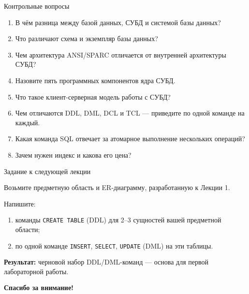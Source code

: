 \documentclass[aspectratio=169]{beamer}
\begin{document}
\begin{frame}{Контрольные вопросы}

\small
\begin{enumerate}
  \item В чём разница между базой данных, СУБД и системой базы данных?
  \item Что различают схема и экземпляр базы данных?
  \item Чем архитектура ANSI/SPARC отличается от внутренней архитектуры СУБД?
  \item Назовите пять программных компонентов ядра СУБД.
  \item Что такое клиент-серверная модель работы с СУБД?
  \item Чем отличаются DDL, DML, DCL и TCL — приведите по одной команде на каждый.
  \item Какая команда SQL отвечает за атомарное выполнение нескольких операций?
  \item Зачем нужен индекс и какова его цена?
\end{enumerate}

\end{frame}


\begin{frame}[fragile]{Задание к следующей лекции}

Возьмите предметную область и ER-диаграмму,
разработанную к Лекции 1.

\vspace{0.3cm}

Напишите:
\begin{enumerate}
  \item команды \texttt{CREATE TABLE} (DDL) для 2--3 сущностей
        вашей предметной области;
  \item по одной команде \texttt{INSERT}, \texttt{SELECT},
        \texttt{UPDATE} (DML) на эти таблицы.
\end{enumerate}

\vspace{0.3cm}

\textbf{Результат:} черновой набор DDL/DML-команд —
основа для первой лабораторной работы.

\end{frame}


\begin{frame}

\thispagestyle{empty}

\vspace*{\fill}

\begin{center}

{\LARGE\bfseries
Спасибо за внимание!
}

\end{center}

\vspace*{\fill}

\end{frame}
\end{document}
